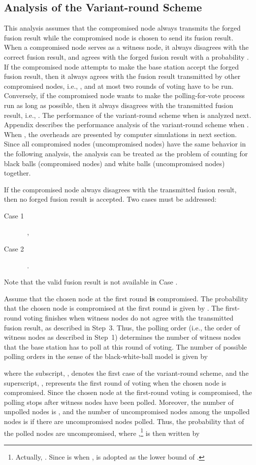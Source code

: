 \documentclass[12pt, onecolumn, draftcls]{IEEEtran}
\begin{document}
\subsection{Analysis of the Variant-round Scheme}
\label{sec:analysis_VR}

This analysis assumes that the compromised node always transmits the
forged fusion result while the compromised node is chosen to send
its fusion result. When a compromised node serves as a witness node,
it always disagrees with the correct fusion result, and agrees with
the forged fusion result with a probability . If the
compromised node attempts to make the base station accept the forged
fusion result, then it always agrees with the fusion result
transmitted by other compromised nodes, i.e., , and at most
two rounds of voting have to be run. Conversely, if the compromised
node wants to make the polling-for-vote process run as long as
possible, then it always disagrees with the transmitted fusion
result, i.e., . The performance of the variant-round scheme
when  is analyzed next. Appendix describes the performance
analysis of the variant-round scheme when . When , the overheads are presented by computer simulations in next
section. Since all compromised nodes (uncompromised nodes) have the
same behavior in the following analysis, the analysis can be treated
as the problem of counting for  black balls (compromised nodes)
and  white balls (uncompromised nodes) together.

If the compromised node always disagrees with the transmitted fusion
result, then no forged fusion result is accepted. Two cases must be
addressed:
\begin{description}
\item[Case 1]\ ,
\item[Case 2]\ .
\end{description}
Note that the valid fusion result is not available in Case .

Assume that the chosen node at the first round {\bf is} compromised.
The probability that the chosen node is compromised at the first
round is given by . The first-round voting finishes when 
witness nodes do not agree with the transmitted fusion result, as
described in Step~3. Thus, the polling order (i.e., the order of
witness nodes as described in Step~1) determines the number of
witness nodes that the base station has to poll at this round of
voting. The number of possible polling orders in the sense of the
black-white-ball model is given by

where the subscript, , denotes the first case of the
variant-round scheme, and the superscript, , represents the
first round of voting when the chosen node is compromised. Since the
chosen node at the first-round voting is compromised, the polling
stops after  witness nodes have been polled. Moreover, the
number of unpolled nodes is , and the number of
uncompromised nodes among the unpolled nodes is  if there are
 uncompromised nodes polled. Thus, the probability that  of
the  polled nodes are uncompromised, where ,\footnote{Actually, . Since  is  when ,  is adopted as the lower bound of
.} is then written by
\end{document}
